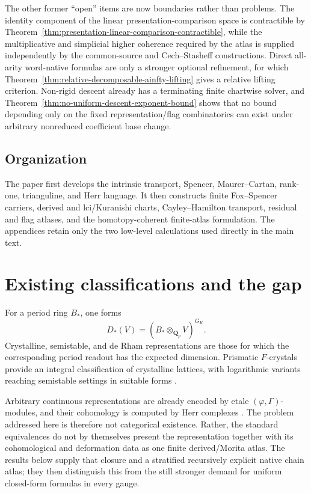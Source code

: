 \documentclass[11pt]{article}
\theoremstyle{definition}
\newcommand{\Qp}{\mathbf Q_p}
\newcommand{\GK}{G_K}
\begin{document}
The other former ``open'' items are now boundaries rather than problems.  The identity component of the linear presentation-comparison space is contractible by Theorem~\ref{thm:presentation-linear-comparison-contractible}, while the multiplicative and simplicial higher coherence required by the atlas is supplied independently by the common-source and Cech--Stasheff constructions.  Direct all-arity word-native formulas are only a stronger optional refinement, for which Theorem~\ref{thm:relative-decomposable-ainfty-lifting} gives a relative lifting criterion.  Non-rigid descent already has a terminating finite chartwise solver, and Theorem~\ref{thm:no-uniform-descent-exponent-bound} shows that no bound depending only on the fixed representation/flag combinatorics can exist under arbitrary nonreduced coefficient base change.

\subsection{Organization}

The paper first develops the intrinsic transport, Spencer, Maurer--Cartan, rank-one, trianguline, and Herr language.  It then constructs finite Fox--Spencer carriers, derived and lci/Kuranishi charts, Cayley--Hamilton transport, residual and flag atlases, and the homotopy-coherent finite-atlas formulation.  The appendices retain only the two low-level calculations used directly in the main text.


\section{Existing classifications and the gap}

For a period ring $B_*$, one forms
\[
D_*(V)=(B_*\otimes_{\Qp}V)^{\GK}.
\]
Crystalline, semistable, and de Rham representations are those for which the corresponding period readout has the expected dimension.  Prismatic $F$-crystals provide an integral classification of crystalline lattices, with logarithmic variants reaching semistable settings in suitable forms \cite{BhattScholzePFC,DuLiuPrismatic}.

Arbitrary continuous representations are already encoded by etale $(\varphi,\Gamma)$-modules, and their cohomology is computed by Herr complexes \cite{FontaineLocal,CherbonnierColmez,HerrSurvey,LiuCohomology,KPXFamilies}.  The problem addressed here is therefore not categorical existence.  Rather, the standard equivalences do not by themselves present the representation together with its cohomological and deformation data as one finite derived/Morita atlas.  The results below supply that closure and a stratified recursively explicit native chain atlas; they then distinguish this from the still stronger demand for uniform closed-form formulas in every gauge.
\end{document}
